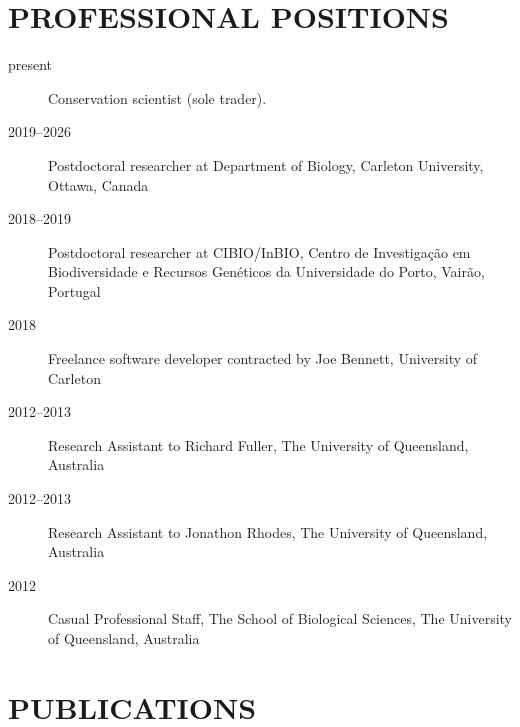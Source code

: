 \documentclass[12pt,a4paper]{article}
\begin{document}
\section*{PROFESSIONAL POSITIONS}
\begin{description}


\item[present] Conservation scientist (sole trader).

\item[2019--2026] Postdoctoral researcher at Department of Biology, Carleton University, Ottawa, Canada

\item[2018--2019] Postdoctoral researcher at CIBIO/InBIO, Centro de Investigação em Biodiversidade e Recursos Genéticos da Universidade do Porto, Vairão, Portugal

\item[2018] Freelance software developer contracted by Joe Bennett, University of Carleton

\item[2012--2013] Research Assistant to Richard Fuller, The University of Queensland, Australia

\item[2012--2013] Research Assistant to Jonathon Rhodes, The University of Queensland, Australia

\item[2012] Casual Professional Staff, The School of Biological Sciences, The University of Queensland, Australia

\end{description}

\clearpage

\section*{PUBLICATIONS}
\end{document}
